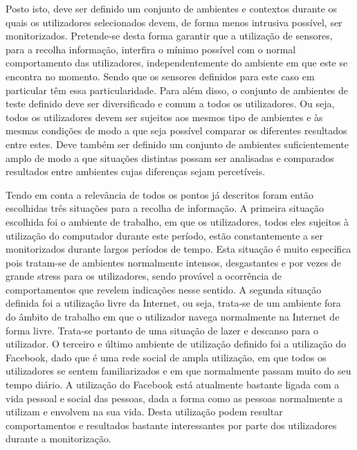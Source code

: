 Posto isto, deve ser definido um conjunto de ambientes e contextos durante os quais os utilizadores selecionados devem, de forma menos intrusiva possível, ser monitorizados. Pretende-se desta forma garantir que a utilização de sensores, para a recolha informação, interfira o mínimo possível com o normal comportamento das utilizadores, independentemente do ambiente em que este se encontra no momento. Sendo que os sensores definidos para este caso em particular têm essa particularidade. Para além disso, o conjunto de ambientes de teste definido deve ser diversificado e comum a todos os utilizadores. Ou seja, todos os utilizadores devem ser sujeitos aos mesmos tipo de ambientes e às mesmas condições de modo a que seja possível comparar os diferentes resultados entre estes. Deve também ser definido um conjunto de ambientes suficientemente amplo de modo a que situações distintas possam ser analisadas e comparados resultados entre ambientes cujas diferenças sejam percetíveis.

Tendo em conta a relevância de todos os pontos já descritos foram então escolhidas três situações para a recolha de informação. A primeira situação escolhida foi o ambiente de trabalho, em que os utilizadores, todos eles sujeitos à utilização do computador durante este período, estão constantemente a ser monitorizados durante largos períodos de tempo. Esta situação é muito específica pois tratam-se de ambientes normalmente intensos, desgastantes e por vezes de grande stress para os utilizadores, sendo provável a ocorrência de comportamentos que revelem indicações nesse sentido. A segunda situação definida foi a utilização livre da Internet, ou seja, trata-se de um ambiente fora do âmbito de trabalho em que o utilizador navega normalmente na Internet de forma livre. Trata-se portanto de uma situação de lazer e descanso para o utilizador. O terceiro e último ambiente de utilização definido foi a utilização do Facebook, dado que é uma rede social de ampla utilização, em que todos os utilizadores se sentem familiarizados e em que normalmente passam muito do seu tempo diário. A utilização do Facebook está atualmente bastante ligada com a vida pessoal e social das pessoas, dada a forma como as pessoas normalmente a utilizam e envolvem na sua vida. Desta utilização podem resultar comportamentos e resultados bastante interessantes por parte dos utilizadores durante a monitorização.

